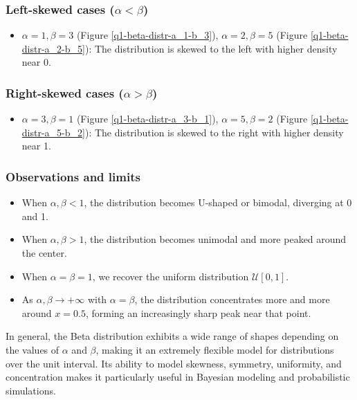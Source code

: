 \subsubsection*{Left-skewed cases ($\alpha < \beta$)}
\begin{itemize}
    \item $\alpha = 1, \beta = 3$ (Figure \ref{q1-beta-distr-a_1-b_3}), $\alpha = 2, \beta = 5$ (Figure \ref{q1-beta-distr-a_2-b_5}): The distribution is skewed to the left with higher density near 0.
\end{itemize}

\subsubsection*{Right-skewed cases ($\alpha > \beta$)}
\begin{itemize}
    \item $\alpha = 3, \beta = 1$ (Figure \ref{q1-beta-distr-a_3-b_1}), $\alpha = 5, \beta = 2$ (Figure \ref{q1-beta-distr-a_5-b_2}): The distribution is skewed to the right with higher density near 1.
\end{itemize}

\subsubsection*{Observations and limits}
\begin{itemize}
    \item When $\alpha, \beta < 1$, the distribution becomes U-shaped or bimodal, diverging at 0 and 1.
    \item When $\alpha, \beta > 1$, the distribution becomes unimodal and more peaked around the center.
    \item When $\alpha = \beta = 1$, we recover the uniform distribution $\mathcal{U}[0, 1]$.
    \item As $\alpha, \beta \to +\infty$ with $\alpha = \beta$, the distribution concentrates more and more around $x = 0.5$, forming an increasingly sharp peak near that point.
\end{itemize}

In general, the Beta distribution exhibits a wide range of shapes depending on the values of $\alpha$ and $\beta$, making it an extremely flexible model for distributions over the unit interval. Its ability to model skewness, symmetry, uniformity, and concentration makes it particularly useful in Bayesian modeling and probabilistic simulations.













